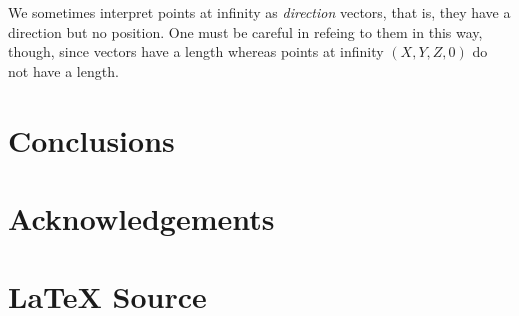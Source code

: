 \documentclass{article}
\theoremstyle{definition}
\begin{document}
\noindent
We sometimes interpret points at infinity as \emph{direction} vectors, that is, they have a direction but no position. One must be careful in refeing to them in this way, though, since vectors have a length whereas points at infinity $(X, Y, Z, 0)$ do not have a length.
\section{Conclusions}
%
%
%
\section{Acknowledgements}
%
%
\section*{\LaTeX \hspace{0.10 mm} Source}
%
%
%


%
%
\end{document}
